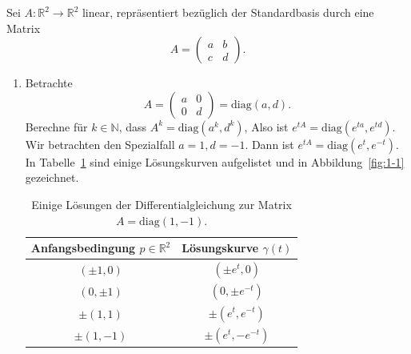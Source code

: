 \documentclass[../main.tex]{subfiles}
\begin{document}
\begin{examples}
  Sei $A \colon \mathbb{R}^2 \to \mathbb{R}^2$ linear,
  repräsentiert bezüglich der Standardbasis
  durch eine Matrix
  \[
    A =
    \begin{pmatrix}
      a & b \\ c & d
    \end{pmatrix}.
  \]
  \begin{enumerate}[(1)]
    \item Betrachte
      \[
        A =
        \begin{pmatrix}
          a & 0 \\ 0 & d
        \end{pmatrix} = \text{diag}(a, d).
      \]
      Berechne für $k \in \mathbb{N}$, dass
      \(
        A^k =
        \text{diag}(a^k, d^k)
      \),
      Also ist
      \(
        e^{tA} =
        \text{diag}(
        e^{ta}, e^{td})
      \).
      Wir betrachten den Spezialfall $a = 1, d = -1$.
      Dann ist
      \(
        e^{tA} = 
        \text{diag}(
          e^t, e^{-t}
          )
      \).
      In Tabelle~\ref{tab:1-1} sind einige
      Lösungskurven aufgelistet und in Abbildung~\ref{fig:1-1}
      gezeichnet. %
      
      \begin{table}[htb]
        \center
        \begin{tabular}{c|c}
          Anfangsbedingung $p \in \mathbb{R}^2$ & Lösungskurve $\gamma(t)$\\
          \hline
          $(\pm 1, 0)$ & $( \pm e^t, 0)$ \\
          $(0, \pm 1)$ & $(0, \pm e^{-t})$ \\
          $\pm(1, 1)$ & $\pm(e^t, e^{-t})$ \\
          $\pm (1, -1)$ & $\pm (e^t, -e^{-t})$
        \end{tabular}
        \caption{Einige Lösungen der Differentialgleichung
        zur Matrix $A = \text{diag}(1, -1)$.}%
        \label{tab:1-1}
      \end{table}


\end{enumerate}
\end{examples}
\end{document}
